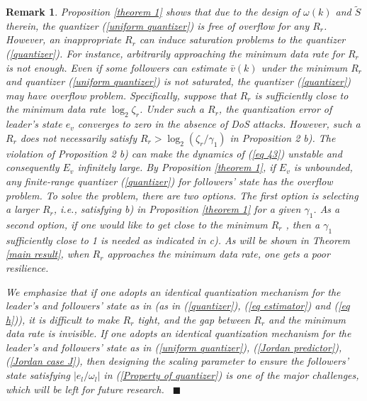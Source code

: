 \documentclass{autart}
\def\qedp{\hspace*{\fill}~{\tiny $\blacksquare$}}
\def\qedp{\hspace*{\fill}~{\tiny $\blacksquare$}}
\newtheorem{itremark}{Remark}
\newenvironment{remark}{\begin{itremark}\rm}{\end{itremark}}
\begin{document}
\begin{remark}\label{remark 3}
Proposition \ref{theorem 1} shows that due to the design of $\omega(k)$ and $\tilde S$ therein, the quantizer (\ref{uniform quantizer}) is free of overflow for any $R_r$. However, an inappropriate $R_r$ can induce saturation problems to the quantizer (\ref{quantizer}). 
For instance, arbitrarily approaching the minimum data rate for $R_r$ is not enough. Even if some followers can estimate $\bar v(k)$ under the minimum $R_r$ and quantizer (\ref{uniform quantizer}) is not saturated, the quantizer (\ref{quantizer}) may have overflow problem. 
Specifically, suppose that $R_r$ is sufficiently close to the minimum data rate $\log_2 \zeta_r$. Under such a $R_r$, the quantization error of leader's state $e_v$ converges to zero in the absence of DoS attacks. However, such a $R_r$ does not necessarily satisfy $R_r > \log_2 (\zeta_r/\gamma_1)$ in Proposition 2 b). The violation of Proposition 2 b) can make the dynamics of (\ref{eq 43}) unstable and consequently $E_v$ infinitely large. By Proposition \ref{theorem 1}, if $E_v$ is unbounded, any finite-range quantizer (\ref{quantizer}) for followers' state has the overflow problem.
To solve the problem, there are two options. The first option is selecting a larger $R_r$, i.e., satisfying b) in Proposition \ref{theorem 1} for a given $\gamma_1$. As a second option, if one would like to get close to the minimum $R_r$ \cite{1310461}, then a $\gamma_1$ sufficiently close to 1 is needed as indicated in c). 
As will be shown in Theorem \ref{main result}, when $R_r$ approaches the minimum data rate, one gets a poor resilience. 


We emphasize that if one adopts an identical quantization mechanism for the leader's and followers' state as in \cite{feng2020arxiv} (as in (\ref{quantizer}), (\ref{eq estimator}) and (\ref{eq h})), it is difficult to make $R_r$ tight, and the gap between $R_r$ and the minimum data rate is invisible. If one adopts an identical quantization mechanism for the leader's and followers' state as in (\ref{uniform quantizer}), (\ref{Jordan predictor}), (\ref{Jordan case J}), then designing the scaling parameter to ensure the followers' state satisfying $|e_l/\omega_l|$ in (\ref{Property of quantizer}) is one of the major challenges, which will be left for future research. 
\qedp
\end{remark}
\end{document}
